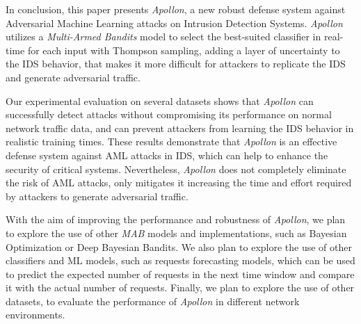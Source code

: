 In conclusion, this paper presents \textit{Apollon}, a new robust defense system against Adversarial Machine Learning attacks
on Intrusion Detection Systems.
\textit{Apollon} utilizes a \textit{Multi-Armed Bandits} model to select the best-suited classifier in
real-time for each input with Thompson sampling, adding a layer of uncertainty to the IDS behavior, that makes it more difficult for
attackers to replicate the IDS and generate adversarial traffic.

Our experimental evaluation on several datasets shows that \textit{Apollon} can successfully detect attacks without compromising
its performance on normal network traffic data, and can prevent attackers from learning the IDS behavior in realistic training times.
These results demonstrate that \textit{Apollon} is an effective defense system against AML attacks in IDS, which
can help to enhance the security of critical systems.
Nevertheless, \textit{Apollon} does not completely eliminate the risk of AML attacks, only mitigates it increasing the
time and effort required by attackers to generate adversarial traffic.

With the aim of improving the performance and robustness of \textit{Apollon}, we plan to explore the use of other \textit{MAB} models and
implementations, such as Bayesian Optimization or Deep Bayesian Bandits.
We also plan to explore the use of other classifiers and ML models, such as requests forecasting models, which can be
used to predict the expected number of requests in the next time window and compare it with the actual number of
requests.
Finally, we plan to explore the use of other datasets, to evaluate the performance of \textit{Apollon} in different network
environments.